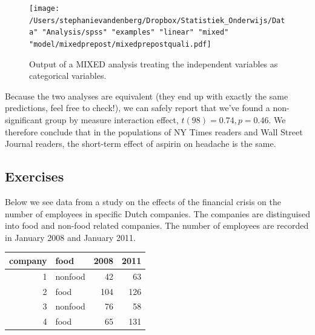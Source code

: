 \documentclass[]{report}\usepackage[]{graphicx}\usepackage[]{color}
\newenvironment{knitrout}{}{} %
\begin{document}
\begin{figure}[h]
    \begin{center}
       \texttt{[image: /Users/stephanievandenberg/Dropbox/Statistiek\_Onderwijs/Data" "Analysis/spss" "examples" "linear" "mixed" "model/mixedprepost/mixedprepostquali.pdf]}
    \end{center}
    \label{fig:mixedprepostquali}
    \caption{Output of a MIXED analysis treating the independent variables as categorical variables.}
\end{figure}



Because the two analyses are equivalent (they end up with exactly the same predictions, feel free to check!), we can safely report that we've found a non-significant group by measure interaction effect, $t(98)=0.74, p=0.46$. We therefore conclude that in the populations of NY Times readers and Wall Street Journal readers, the short-term effect of aspirin on headache is the same. 



\subsection{Exercises}

Below we see data from a study on the effects of the financial crisis on the number of employees in specific Dutch companies. The companies are distinguised into food and non-food related companies. The number of employees are recorded in January 2008 and January 2011.

\begin{knitrout}
\color{fgcolor}
\begin{tabular}{r|l|r|r}
\hline
company & food & 2008 & 2011\\
\hline
1 & nonfood & 42 & 63\\
\hline
2 & food & 104 & 126\\
\hline
3 & nonfood & 76 & 58\\
\hline
4 & food & 65 & 131\\
\hline
\end{tabular}


\end{knitrout}
\end{document}
